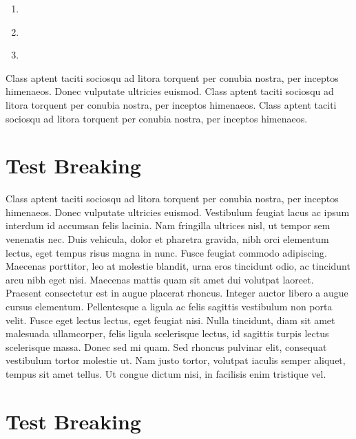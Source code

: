 \begin{enumerate}
\item{\label{chapx-exer1}}
\item{\label{chapx-exer2}}
\item{\label{chapx-exer3}}
\end{enumerate}

Class aptent taciti sociosqu ad litora torquent per conubia nostra, per inceptos himenaeos. Donec vulputate ultricies euismod. Class aptent taciti sociosqu ad litora torquent per conubia nostra, per inceptos himenaeos. Class aptent taciti sociosqu ad litora torquent per conubia nostra, per inceptos himenaeos. 

\section{Test Breaking}

Class aptent taciti sociosqu ad litora torquent per conubia nostra, per inceptos himenaeos. Donec vulputate ultricies euismod. Vestibulum feugiat lacus ac ipsum interdum id accumsan felis lacinia. Nam fringilla ultrices nisl, ut tempor sem venenatis nec. Duis vehicula, dolor et pharetra gravida, nibh orci elementum lectus, eget tempus risus magna in nunc. Fusce feugiat commodo adipiscing. Maecenas porttitor, leo at molestie blandit, urna eros tincidunt odio, ac tincidunt arcu nibh eget nisi. Maecenas mattis quam sit amet dui volutpat laoreet. Praesent consectetur est in augue placerat rhoncus. Integer auctor libero a augue cursus elementum. Pellentesque a ligula ac felis sagittis vestibulum non porta velit. Fusce eget lectus lectus, eget feugiat nisi. Nulla tincidunt, diam sit amet malesuada ullamcorper, felis ligula scelerisque lectus, id sagittis turpis lectus scelerisque massa. Donec sed mi quam. Sed rhoncus pulvinar elit, consequat vestibulum tortor molestie ut. Nam justo tortor, volutpat iaculis semper aliquet, tempus sit amet tellus. Ut congue dictum nisi, in facilisis enim tristique vel. 

\section{Test Breaking}

